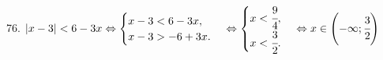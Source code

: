 76. $|x-3|<6-3x\Leftrightarrow\begin{cases} x-3<6-3x,\\x-3>-6+3x.\end{cases}
\Leftrightarrow\begin{cases} x<\cfrac{9}{4},\\ x<\cfrac{3}{2}.\end{cases}\Leftrightarrow x\in\left(-\infty;\cfrac{3}{2}\right)$\\
